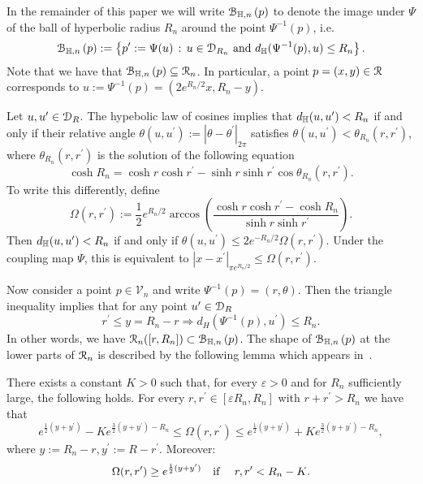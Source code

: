 In the remainder of this paper we will write ${\mathcal B}_{\mathbb{H},n}\left(p\right)$ to denote the image under $\Psi$ of the ball of hyperbolic radius $R_n$ around the point $\Psi^{-1}(p)$, i.e. 
\[
	{\mathcal B}_{\mathbb{H},n}\left(p\right) := \left\{p^\prime := \Psi(u) \, : \, u \in {\mathcal D}_{R_n} \text{ and } d_{\mathbb{H}}(\Psi^{-1}(p),u) \le R_n\right\}.
\]
Note that we have that ${\mathcal B}_{\mathbb{H},n}\left(p\right) \subseteq \mathcal{R}_n$. In particular, a point $p = (x,y) \in {\mathcal R}$ corresponds to $u := \Psi^{-1}(p) = (2 e^{R_n/2} x, R_n - y)$. 

Let $u, u^\prime \in {\mathcal D}_R$. The hypebolic law of cosines implies that $d_{\mathbb{H}}(u,u^\prime) < R_n$ if and only if their relative angle $\theta(u, u^\prime) := |\theta - \theta^\prime|_{2\pi}$ satisfies $\theta(u, u^\prime) < \theta_{R_n}(r,r^\prime)$, where $\theta_{R_n}(r,r^\prime)$ is the solution of the following equation
\[
	\cosh R_n =\cosh r \cosh r^\prime - \sinh r \sinh r^\prime \cos \theta_{R_n}(r,r^\prime).
\]
To write this differently, define
\begin{equation}\label{eq:def_Omega_hyperbolic}
	\Omega(r,r^\prime) := \frac{1}{2}e^{R_n/2} \arccos\left( \frac{\cosh r \cosh r^\prime - \cosh R_n}
	{\sinh r \sinh r^\prime} \right).
\end{equation}
Then $d_{\mathbb{H}}(u,u^\prime) < R_n$ if and only if $\theta(u, u^\prime) \leq 2 e^{-R_n/2}\Omega(r,r^\prime)$. Under the coupling map $\Psi$, this is equivalent to $|x-x^\prime|_{\pi e^{R_n/2}} \le \Omega(r,r^\prime)$.

Now consider a point $p \in \mathcal{V}_n$ and write $\Psi^{-1}(p) = (r,\theta)$. Then the triangle inequality implies that
for any point $u^\prime \in {\mathcal D}_R$
\begin{equation}\label{eq:tail_inclusion_hyperbolic_ball}
	r^\prime \leq y = R_n - r \Rightarrow d_H (\Psi^{-1}(p),u^\prime) \leq R_n.
\end{equation}
In other words, we have ${\mathcal R}_n ([r, R_n])  \subset {\mathcal B}_{\mathbb{H},n}\left(p\right)$. The shape of ${\mathcal B}_{\mathbb{H},n}\left(p\right)$ at the lower parts of ${\mathcal R}_n$ is described by the following lemma which appears in~\cite{fountoulakis2018law}. 


\begin{lemma}\label{lem:asymptotics_Omega_hyperbolic}
There exists a constant $K>0$ such that, for every $\varepsilon > 0$ and for $R_n$ sufficiently large, the following holds.
For every $r,r^\prime \in [\varepsilon R_n,R_n]$ with $r + r^\prime > R_n$ we have that 
\begin{equation}\label{eq:asymp1}
	e^{\frac{1}{2}(y+y^\prime)} - K e^{\frac{3}{2}(y+y^\prime) - R_n} \leq \Omega(r, r^\prime) 
	\leq  e^{\frac{1}{2}(y+y^\prime)} + K e^{\frac{3}{2}(y+y^\prime) - R_n},
\end{equation}
where $y := R_n - r, y^\prime := R - r^\prime$. 
Moreover:
\begin{equation}\label{eq:asymp2} 
\Omega(r,r^\prime) \geq e^{\frac12(y+y^\prime)} \quad \text{if \quad $r, r^\prime < R_n - K$.} 
\end{equation}
\end{lemma}

